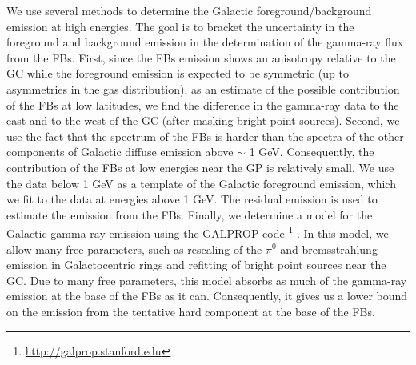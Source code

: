 We use several methods to determine the Galactic foreground/background emission at high energies.
The goal is to bracket the uncertainty in the foreground and background emission in the determination of 
the gamma-ray flux from the FBs.
First, since the FBs emission shows an anisotropy relative to the GC
while the foreground emission is expected to be symmetric (up to asymmetries in the gas distribution),
as an estimate of the possible contribution of the FBs at low latitudes, 
we find the difference in the gamma-ray data to the east and to the west of the GC 
(after masking bright point sources).
Second, we use the fact that the spectrum of the FBs is harder than the spectra of the other components of Galactic diffuse emission
above $\sim$ 1 GeV.
Consequently, the contribution of the FBs at low energies near the GP is relatively small. 
We use the data below 1 GeV as a template of the Galactic foreground emission, 
which we fit to the data at energies above 1 GeV.
The residual emission is used to estimate the emission from the FBs.
Finally, we determine a model for the Galactic gamma-ray emission using the GALPROP code%
\footnote{\url{http://galprop.stanford.edu}} 
\citep{Moskalenko:1997gh, Strong:1998fr, Strong:2004de, Ptuskin:2005ax, 2007ARNPS..57..285S, Porter:2008ve,Vladimirov:2010aq}. 
In this model, we allow many free parameters, such as rescaling of the $\pi^0$ and bremsstrahlung emission in Galactocentric rings and
refitting of bright point sources near the GC.
Due to many free parameters, this model absorbs as much of the gamma-ray emission at the base of the FBs as it can.
Consequently, it gives us a lower bound on the emission from the tentative hard component at the base of the FBs.





